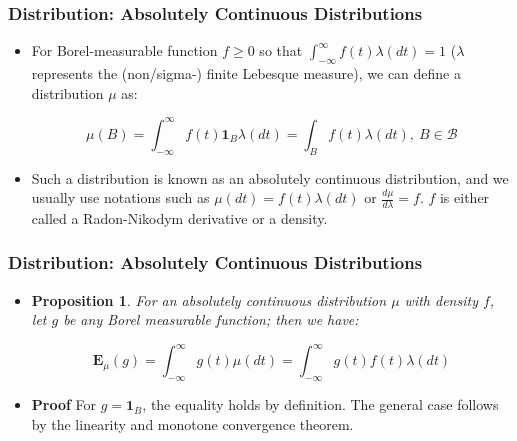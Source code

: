 \documentclass[handout]{beamer}
\newtheorem{Proposition}[theorem]{Proposition}%
\newcommand{\BE}{\mathbf{E}}
\newcommand{\BI}{\mathbf{1}}
\begin{document}
\frame
{
  \frametitle{Distribution: Absolutely Continuous Distributions} 

   \begin{itemize}
  
                \item<1->  For Borel-measurable function $f\geq 0$ so that $\int_{-\infty}^{\infty} f(t)\lambda(dt)=1$ ($\lambda$ represents the (non/sigma-) finite Lebesque measure), we can define a distribution $\mu$ as:
                
                $$\mu(B)=\int_{-\infty}^{\infty} f(t) \BI_B \lambda(dt)=\int_{B} f(t) \lambda(dt), \ B\in \mathcal{B}$$
                
                
             \item<2->  Such a distribution is known as an absolutely continuous distribution, and we usually use notations such as  $\mu(dt)=f(t)\lambda(dt)$ or $\frac{d\mu }{d\lambda} =f$. $f$ is either called a Radon-Nikodym derivative or a density.
             
\end{itemize}
}


\frame
{
  \frametitle{Distribution: Absolutely Continuous Distributions} 

   \begin{itemize}
  
                            \item<3->[] \begin{Proposition} For an absolutely continuous distribution $\mu$ with density $f$, let $g$ be any Borel measurable function; then we have: 
          
           $$\BE_{\mu}(g)=\int_{-\infty}^{\infty} g(t) \mu(dt)=  \int_{-\infty}^{\infty} g(t) f(t) \lambda(dt)$$ \end{Proposition}

                                                  \item<4-> \textbf{Proof} For $g=\BI_B$, the equality holds by definition. The general case follows by the linearity and monotone convergence theorem. 
                              
                                
\end{itemize}
}
\end{document}
